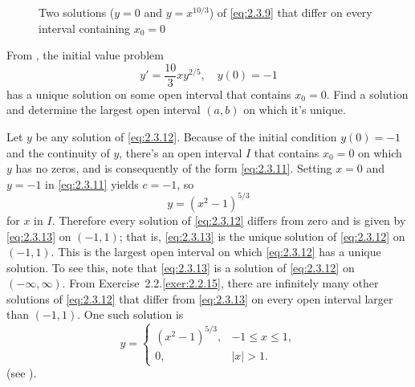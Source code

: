 \begin{figure}
  \centering
\caption{Two solutions ($y=0$ and $y=x^{10/3}$) of \eqref{eq:2.3.9}  that
differ on every interval  containing $x_{0}=0$}
  \label{figure:2.3.2}
\end{figure}

\begin{example} \label{example:2.3.7}
From , the initial value
problem
\begin{equation} \label{eq:2.3.12}
y'=\frac{10 }{3}xy^{2/5}, \quad y(0)=-1
\end{equation}
 has a  unique solution on some open interval that contains $x_0=0$.
Find a solution and determine the largest open interval $(a,b)$ on
which it's unique.
\end{example}

\begin{solution}
Let $y$ be any solution of \eqref{eq:2.3.12}. Because of the initial
condition $y(0)=-1$ and the continuity of $y$, there's an open interval
$I$ that contains $x_0=0$ on which $y$ has no zeros, and is consequently
of the form \eqref{eq:2.3.11}. Setting $x=0$ and $y=-1$ in \eqref{eq:2.3.11}
yields $c=-1$, so
\begin{equation} \label{eq:2.3.13}
y=(x^2-1)^{5/3}
\end{equation}
for $x$  in $I$.
Therefore every solution of \eqref{eq:2.3.12} differs from zero
and is given by \eqref{eq:2.3.13} on $(-1,1)$; that is,
\eqref{eq:2.3.13} is the unique solution of \eqref{eq:2.3.12} on
$(-1,1)$.
 This is the largest open interval on which
\eqref{eq:2.3.12} has a unique solution. To see this, note that
\eqref{eq:2.3.13} is a solution of \eqref{eq:2.3.12} on $(-\infty,\infty)$.
From {Exercise~2.2.\ref{exer:2.2.15}}, there are infinitely many
other solutions
of \eqref{eq:2.3.12} that differ from \eqref{eq:2.3.13} on every open interval
larger than
$(-1,1)$. One such solution is
\[
y =
\begin{cases}
(x^2-1)^{5/3}, & -1 \le x \le 1, \\
0,             & |x|>1.
\end{cases}
\]
(see ).
\end{solution}

